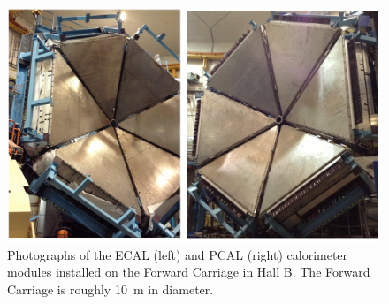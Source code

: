 \documentclass[letterpaper,10pt]{article}
\begin{document}
\begin{figure}[htbp]
  \centering
  \includegraphics[width= 5in, keepaspectratio = true]{fc-pcal-ecal}
  \vspace{2mm}
\caption{Photographs of the ECAL (left) and PCAL (right) calorimeter modules installed on the Forward
    Carriage in Hall B.  The Forward Carriage is roughly 10~m in diameter.}
  \label{fwd_car}
\end{figure}
\end{document}

